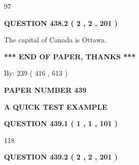 \documentclass[12pt]{article}
\begin{document}
97
 
 
  
\vspace{0.2in}
  
{\textbf{\Large{QUESTION
438.2 
 ( 2 , 2 , 201 )
}}}
  
  
 
 
\noindent{}
 
 
The capital of Canada is Ottawa.
 
 
 
 
   
   
 \vspace{0.2in}
 
   
   
   
   
\vspace{1.0in} 
{\textbf{\large{ *** END OF PAPER, THANKS *** }}} 
   
   
\hspace{1.0in} By: 
 239 ( 416 ,  613 )
   
   
   
   
\newpage 
\setcounter{page}{ 
   439001 } 
   
   
   
   
 {\textbf{ \Large{ PAPER NUMBER  439  }}}
   
   
\vspace{0.2in}
   
   
   
   
   
   
 \vspace{0.2in}
{\LARGE {\textbf{ A QUICK TEST EXAMPLE}}}
   
   
  
\vspace{0.2in}
  
{\textbf{\Large{QUESTION
439.1 
 ( 1 , 1 , 101 )
}}}
  
  
 
 
\noindent{}

118
 
 
  
\vspace{0.2in}
  
{\textbf{\Large{QUESTION
439.2 
 ( 2 , 2 , 201 )
}}}
  
\end{document}
